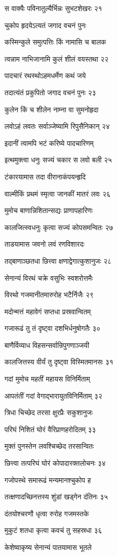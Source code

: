 स वाक्यैः पविनातुल्यैर्भिन्नः सुभटशेखरः २१

चुकोप हृदयेऽत्यतं जगाद वचनं पुनः

कस्मिन्कुले समुत्पत्तिः किं नामासि च बालक

त्वन्नाम नाभिजानामि कुलं शीलं वयस्तथा २२

पादचारं रथस्थोऽहमधर्मेण कथं जये

तदात्यंतं प्रकुपितो जगाद वचनं पुनः २३

कुलेन किं च शीलेन नाम्ना वा सुमनोहृदा

लवोऽहं लवतः सर्वाञ्जेष्यामि रिपुसैनिकान् २४

इदानीं त्वामपि भटं करिष्ये पादचारिणम्

इत्थमुक्त्वा धनुः सज्यं चकार स लवो बली २५

टंकारयामास तदा वीरानाकंपयन्हृदि

वाल्मीकिं प्रथमं स्मृत्वा जानकीं मातरं लवः २६

मुमोच बाणान्निशितान्सद्यः प्राणापहारिणः

कालजित्स्वधनुः कृत्वा सज्यं कोपसमन्वितः २७

ताडयामास जवनो लवं रणविशारदः

तद्बाणाञ्छतधा छित्त्वा क्षणाद्वेगात्कुशानुजः २८

सेनान्यं विरथं चक्रे वसुभिः स्वशरोत्तमैः

विरथो गजमानीतमारुरोह भटैर्निजैः २९

मदोन्मत्तं महावेगं सप्तधा प्रस्रवान्वितम्

गजारूढं तु तं दृष्ट्वा दशभिर्धनुषोगतैः ३०

बाणैर्विव्याध विहसन्सर्वान्रिपुगणाञ्जयी

कालजित्तस्य वीर्यं तु दृष्ट्वा विस्मितमानसः ३१

गदां मुमोच महतीं महायस विनिर्मिताम्

आपतंतीं गदां वेगाद्भारायुतविनिर्मिताम् ३२

त्रिधा चिच्छेद तरसा क्षुरप्रैः सकुशानुजः

परिघं निशितं घोरं वैरिप्राणहरोदितम् ३३

मुक्तं पुनस्तेन लवश्चिच्छेद तरसान्वितः

छित्त्वा तत्परिघं घोरं कोपादारक्तलोचनः ३४

गजोपस्थे समारूढं मन्यमानश्चुकोप ह

तत्क्षणादच्छिनत्तस्य शुंडां खड्गेन दंतिनः ३५

दंतयोश्चरणौ धृत्वा रुरोह गजमस्तके

मुकुटं शतधा कृत्वा कवचं तु सहस्रधा ३६

केशेष्वाकृष्य सेनान्यं पातयामास भूतले

